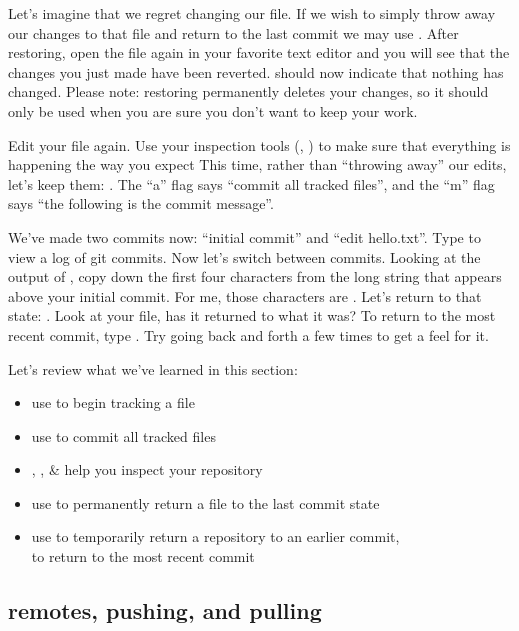 \documentclass{training}
\begin{document}
Let's imagine that we regret changing our file.
If we wish to simply throw away our changes to that file and return to the last commit we may use .
After restoring, open the file again in your favorite text editor and you will see that the changes you just made have been reverted.
 should now indicate that nothing has changed.
Please note: restoring permanently deletes your changes, so it should only be used when you are sure you don't want to keep your work.

Edit your  file again.
Use your inspection tools (, ) to make sure that everything is happening the way you expect
This time, rather than ``throwing away'' our edits, let's keep them: .
The ``a'' flag says ``commit all tracked files'', and the ``m'' flag says ``the following is the commit message''.

We've made two commits now: ``initial commit'' and ``edit hello.txt''.
Type  to view a log of git commits.
Now let's switch between commits.
Looking at the output of , copy down the first four characters from the long string that appears above your initial commit.
For me, those characters are .
Let's return to that state: .
Look at your file, has it returned to what it was?
To return to the most recent commit, type .
Try going back and forth a few times to get a feel for it.


Let's review what we've learned in this section:
\begin{itemize}
  \item use  to begin tracking a file
  \item use  to commit all tracked files
  \item {}, , \&  help you inspect your repository
  \item use  to permanently return a file to the last commit state
  \item use  to temporarily return a repository to an earlier commit, \\
     to return to the most recent commit
\end{itemize}

\subsection{remotes, pushing, and pulling}
\end{document}
